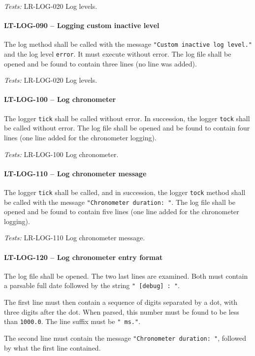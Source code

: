\textit{Tests: } LR-LOG-020 Log levels.

\paragraph{LT-LOG-090 -- Logging custom inactive level}
The log method shall be called with the message
\lstinline{"Custom inactive log level."} and the log level
\lstinline{error}. It must execute without error.
The log file shall be opened and be found to contain three lines
(no line was added).

\textit{Tests: } LR-LOG-020 Log levels.

\paragraph{LT-LOG-100 -- Log chronometer}
The logger \lstinline{tick} shall be called without error.
In succession, the logger \lstinline{tock} shall be called without error.
The log file shall be opened and be found to contain four lines
(one line added for the chronometer logging).

\textit{Tests: } LR-LOG-100 Log chronometer.

\paragraph{LT-LOG-110 -- Log chronometer message}
The logger \lstinline{tick} shall be called,
and in succession, the logger \lstinline{tock} method shall
be called with the message \lstinline{"Chronometer duration: "}.
The log file shall be opened and be found to contain five lines
(one line added for the chronometer logging).

\textit{Tests: } LR-LOG-110 Log chronometer message.

\paragraph{LT-LOG-120 -- Log chronometer entry format}
The log file shall be opened. The two last lines are examined.
Both must contain a parsable full date followed by
the string \lstinline{" [debug] : "}.

The first line must then contain a sequence of digits separated
by a dot, with three digits after the dot. When parsed, this number
must be found to be less than \lstinline{1000.0}. The line suffix
must be \lstinline{" ms."}.

The second line must contain the message
\lstinline{"Chronometer duration: "}, followed by what the first line
contained.


